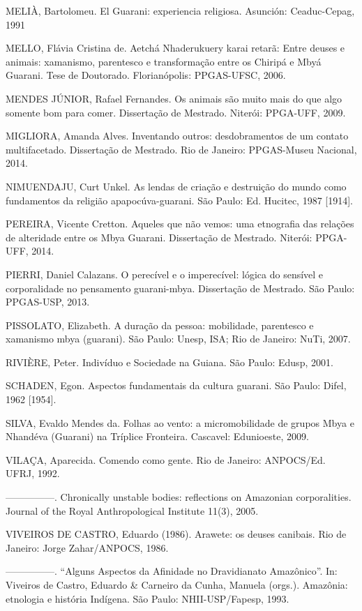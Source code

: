 \documentclass{article}
\begin{document}
MELI\`A, Bartolomeu. El Guarani: experiencia religiosa. Asunci\'on:
Ceaduc-Cepag, 1991

MELLO, Fl\'avia Cristina de. Aetch\'a Nhaderukuery karai retar\~a: Entre
deuses e animais: xamanismo, parentesco e transforma\c{c}\~ao entre os
Chirip\'a e Mby\'a Guarani. Tese de Doutorado. Florian\'opolis:
PPGAS-UFSC, 2006.

MENDES J\'UNIOR, Rafael Fernandes. Os animais s\~ao muito mais do que
algo somente bom para comer. Disserta\c{c}\~ao de Mestrado. Niter\'oi:
PPGA-UFF, 2009.

MIGLIORA, Amanda Alves. Inventando outros: desdobramentos de um contato
multifacetado. Disserta\c{c}\~ao de Mestrado. Rio de Janeiro:
PPGAS-Museu Nacional, 2014.

NIMUENDAJU, Curt Unkel. As lendas de cria\c{c}\~ao e destrui\c{c}\~ao do
mundo como fundamentos da religi\~ao apapoc\'uva-guarani. S\~ao Paulo:
Ed. Hucitec, 1987 [1914].

PEREIRA, Vicente Cretton. Aqueles que n\~ao vemos: uma etnografia das
rela\c{c}\~oes de alteridade entre os Mbya Guarani. Disserta\c{c}\~ao
de Mestrado. Niter\'oi: PPGA-UFF, 2014.

PIERRI, Daniel Calazans. O perec\'ivel e o imperec\'ivel: l\'ogica do
sens\'ivel e corporalidade no pensamento guarani-mbya.
Disserta\c{c}\~ao de Mestrado. S\~ao Paulo: PPGAS-USP, 2013.

PISSOLATO, Elizabeth. A dura\c{c}\~ao da pessoa: mobilidade, parentesco
e xamanismo mbya (guarani). S\~ao Paulo: Unesp, ISA; Rio de Janeiro:
NuTi, 2007.

RIVI\`ERE, Peter. Indiv\'iduo e Sociedade na Guiana. S\~ao Paulo: Edusp,
2001.

SCHADEN, Egon. Aspectos fundamentais da cultura guarani. S\~ao Paulo:
Difel, 1962 [1954]. 

SILVA, Evaldo Mendes da. Folhas ao vento: a micromobilidade de grupos
Mbya e Nhand\'eva (Guarani) na Tr\'iplice Fronteira. Cascavel:
Edunioeste, 2009.

VILA\c{C}A, Aparecida. Comendo como gente. Rio de Janeiro: ANPOCS/Ed.
UFRJ, 1992.

{}---{}---{}---{}---{}---. Chronically unstable bodies: reflections on
Amazonian corporalities. Journal of the Royal Anthropological Institute
11(3), 2005.

VIVEIROS DE CASTRO, Eduardo (1986). Arawete: os deuses canibais. Rio de
Janeiro: Jorge Zahar/ANPOCS, 1986.

{}---{}---{}---{}---{}---. {\textquotedblleft}Alguns Aspectos da
Afinidade no Dravidianato Amaz\^onico{\textquotedblright}. In: Viveiros
de Castro, Eduardo \& Carneiro da Cunha, Manuela (orgs.). Amaz\^onia:
etnologia e hist\'oria Ind\'igena. S\~ao Paulo: NHII-USP/Fapesp, 1993.
\end{document}
